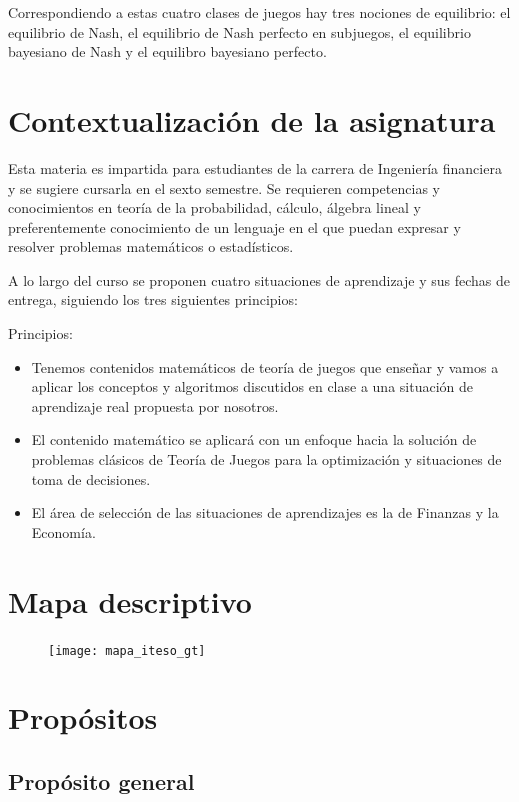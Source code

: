 \documentclass[11pt]{article}
\begin{document}
Correspondiendo a estas cuatro clases de juegos hay tres nociones de equilibrio: el equilibrio de Nash, el equilibrio de Nash perfecto en subjuegos, el equilibrio bayesiano de Nash y el equilibro bayesiano perfecto.

\section{Contextualización de la asignatura}

Esta materia es impartida para estudiantes de la carrera de Ingeniería financiera y se sugiere cursarla en el sexto semestre. Se requieren competencias y conocimientos en teoría de la probabilidad, cálculo, álgebra lineal y preferentemente conocimiento de un lenguaje en el que puedan expresar y resolver problemas matemáticos o estadísticos.

A lo largo del curso se proponen cuatro situaciones de aprendizaje y sus fechas de entrega, siguiendo los tres siguientes principios:

	\begin{mybox}{Principios:}
		\begin{itemize}
			\item Tenemos contenidos matemáticos de teoría de juegos que enseñar y vamos a aplicar los conceptos y algoritmos discutidos en clase a una situación de aprendizaje real propuesta por nosotros.
			\item El contenido matemático se aplicará con un enfoque hacia la solución de problemas clásicos de Teoría de Juegos para la optimización y situaciones de toma de decisiones.
			\item El área de selección de las situaciones de aprendizajes es la de Finanzas y la Economía.
		\end{itemize}
	\end{mybox}

\section{Mapa descriptivo}

	\begin{figure}[ht]
		\centering
		\texttt{[image: mapa\_iteso\_gt]}
	\end{figure}

\section{Propósitos}

\subsection{Propósito general}
\end{document}
